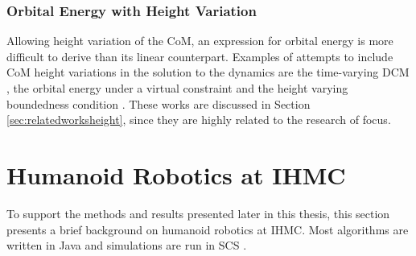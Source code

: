 \subsubsection{Orbital Energy with Height Variation}\label{subsec:nonorbit} 
Allowing height variation of the \ac{CoM}, an expression for orbital energy is more difficult to derive than its linear counterpart.  Examples of attempts to include \ac{CoM} height variations in the solution to the dynamics are the time-varying \ac{DCM} \cite{hopkins2014humanoid}, the orbital energy under a virtual constraint \cite{pratt2007derivation} and the height varying boundedness condition \cite{caron2018balance}. These works are discussed in Section 
\ref{sec:relatedworksheight}, since they are highly related to the research of focus.

\section{Humanoid Robotics at IHMC}\label{sec:ihmc}
To support the methods and results presented later in this thesis, this section presents a brief background on humanoid robotics at \ac{IHMC}. Most algorithms are written in Java and simulations are run in \ac{SCS} \cite{scs}.
